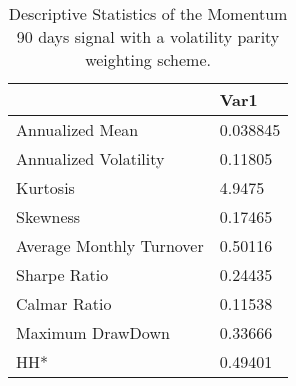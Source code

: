 \begin{table}[H]
\centering
\begin{tabular}{ll}
& Var1 \\ 
\hline 
Annualized Mean & 0.038845 \\ 
Annualized Volatility & 0.11805 \\ 
Kurtosis & 4.9475 \\ 
Skewness & 0.17465 \\ 
Average Monthly Turnover & 0.50116 \\ 
Sharpe Ratio & 0.24435 \\ 
Calmar Ratio & 0.11538 \\ 
Maximum DrawDown & 0.33666 \\ 
HH* & 0.49401 \\ 
\hline
\end{tabular}
\caption{Descriptive Statistics of the Momentum 90 days signal with a volatility parity weighting scheme.}
\label{MOM90VP}
\end{table}